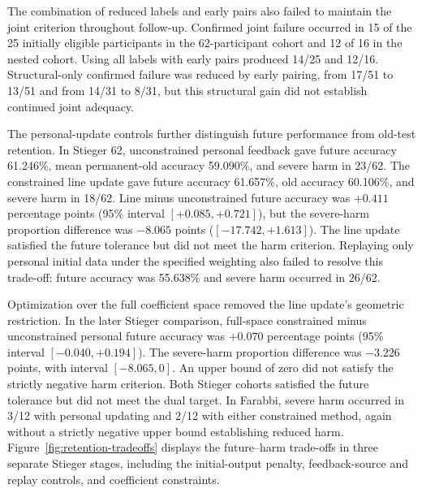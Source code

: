 \documentclass[11pt,a4paper]{article}
\begin{document}
The combination of reduced labels and early pairs also failed to maintain the joint criterion throughout follow-up. Confirmed joint failure occurred in 15 of the 25 initially eligible participants in the 62-participant cohort and 12 of 16 in the nested cohort. Using all labels with early pairs produced 14/25 and 12/16. Structural-only confirmed failure was reduced by early pairing, from 17/51 to 13/51 and from 14/31 to 8/31, but this structural gain did not establish continued joint adequacy.

The personal-update controls further distinguish future performance from old-test retention. In Stieger 62, unconstrained personal feedback gave future accuracy 61.246\%, mean permanent-old accuracy 59.090\%, and severe harm in 23/62. The constrained line update gave future accuracy 61.657\%, old accuracy 60.106\%, and severe harm in 18/62. Line minus unconstrained future accuracy was $+0.411$ percentage points (95\% interval $[+0.085,+0.721]$), but the severe-harm proportion difference was $-8.065$ points ($[-17.742,+1.613]$). The line update satisfied the future tolerance but did not meet the harm criterion. Replaying only personal initial data under the specified weighting also failed to resolve this trade-off: future accuracy was 55.638\% and severe harm occurred in 26/62.

Optimization over the full coefficient space removed the line update's geometric restriction. In the later Stieger comparison, full-space constrained minus unconstrained personal future accuracy was $+0.070$ percentage points (95\% interval $[-0.040,+0.194]$). The severe-harm proportion difference was $-3.226$ points, with interval $[-8.065,0]$. An upper bound of zero did not satisfy the strictly negative harm criterion. Both Stieger cohorts satisfied the future tolerance but did not meet the dual target. In Farabbi, severe harm occurred in 3/12 with personal updating and 2/12 with either constrained method, again without a strictly negative upper bound establishing reduced harm. Figure~\ref{fig:retention-tradeoffs} displays the future--harm trade-offs in three separate Stieger stages, including the initial-output penalty, feedback-source and replay controls, and coefficient constraints.
\end{document}
